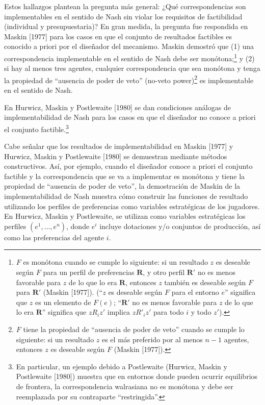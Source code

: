 \documentclass[12pt, letterpaper]{article}
\begin{document}
Estos hallazgos plantean la pregunta más general: ¿Qué correspondencias son implementables en el sentido de Nash sin violar los requisitos de factibilidad (individual y presupuestaria)? En gran medida, la pregunta fue respondida en Maskin [1977] para los casos en que el conjunto de resultados factibles es conocido a priori por el diseñador del mecanismo. Maskin demostró que (1) una correspondencia implementable en el sentido de Nash debe ser monótona;\footnote{$F$ es monótona cuando se cumple lo siguiente: si un resultado $z$ es deseable según $F$ para un perfil de preferencias $\mathbf{R}$, y otro perfil $\mathbf{R}'$ no es menos favorable para $z$ de lo que lo era $\mathbf{R}$, entonces $z$ también es deseable según $F$ para $\mathbf{R}'$ (Maskin [1977]). (``$z$ es deseable según $F$ para el entorno $e$'' significa que $z$ es un elemento de $F(e)$; ``$\mathbf{R}'$ no es menos favorable para $z$ de lo que lo era $\mathbf{R}$'' significa que $z R_i z'$ implica $z R'_i z'$ para todo $i$ y todo $z'$).} y (2) si hay al menos tres agentes, cualquier correspondencia que sea monótona y tenga la propiedad de ``ausencia de poder de veto'' (no-veto power)\footnote{$F$ tiene la propiedad de ``ausencia de poder de veto'' cuando se cumple lo siguiente: si un resultado $z$ es el más preferido por al menos $n - 1$ agentes, entonces $z$ es deseable según $F$ (Maskin [1977]).} es implementable en el sentido de Nash.

En Hurwicz, Maskin y Postlewaite [1980] se dan condiciones análogas de implementabilidad de Nash para los casos en que el diseñador no conoce a priori el conjunto factible.\footnote{En particular, un ejemplo debido a Postlewaite (Hurwicz, Maskin y Postlewaite [1980]) muestra que en entornos donde pueden ocurrir equilibrios de frontera, la correspondencia walrasiana no es monótona y debe ser reemplazada por su contraparte ``restringida''.}

Cabe señalar que los resultados de implementabilidad en Maskin [1977] y Hurwicz, Maskin y Postlewaite [1980] se demuestran mediante métodos constructivos. Así, por ejemplo, cuando el diseñador conoce a priori el conjunto factible y la correspondencia que se va a implementar es monótona y tiene la propiedad de ``ausencia de poder de veto'', la demostración de Maskin de la implementabilidad de Nash muestra cómo construir las funciones de resultado utilizando los perfiles de preferencias como variables estratégicas de los jugadores. En Hurwicz, Maskin y Postlewaite, se utilizan como variables estratégicas los perfiles $(e^1, \dots, e^n)$, donde $e^i$ incluye dotaciones y/o conjuntos de producción, así como las preferencias del agente $i$.
\end{document}
